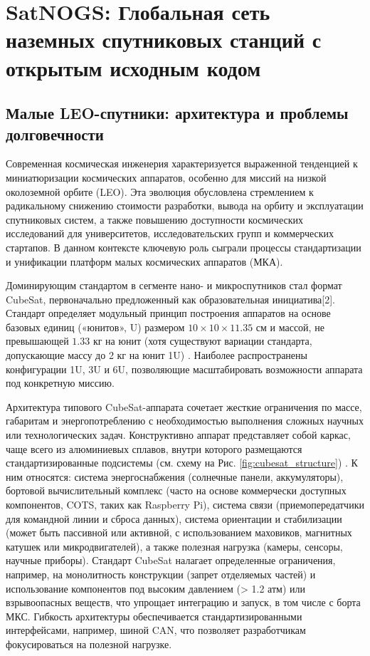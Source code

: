 \chapter{SatNOGS: Глобальная сеть наземных спутниковых станций с открытым исходным кодом}

\section{Малые LEO-спутники: архитектура и проблемы долговечности}

Современная космическая инженерия характеризуется выраженной тенденцией к миниатюризации космических аппаратов, особенно для миссий на низкой околоземной орбите (LEO). Эта эволюция обусловлена стремлением к радикальному снижению стоимости разработки, вывода на орбиту и эксплуатации спутниковых систем, а также повышению доступности космических исследований для университетов, исследовательских групп и коммерческих стартапов. В данном контексте ключевую роль сыграли процессы стандартизации и унификации платформ малых космических аппаратов (МКА).

Доминирующим стандартом в сегменте нано- и микроспутников стал формат CubeSat, первоначально предложенный как образовательная инициатива[2]. Стандарт определяет модульный принцип построения аппаратов на основе базовых единиц («юнитов», U) размером $10 \times 10 \times 11.35$ см и массой, не превышающей $1.33$ кг на юнит (хотя существуют вариации стандарта, допускающие массу до 2 кг на юнит 1U) \cite{cubesat_standard_2014}. Наиболее распространены конфигурации 1U, 3U и 6U, позволяющие масштабировать возможности аппарата под конкретную миссию.

Архитектура типового CubeSat-аппарата сочетает жесткие ограничения по массе, габаритам и энергопотреблению с необходимостью выполнения сложных научных или технологических задач\cite{cubesat_arch_jones_2022, cubesat_low_orbit_nasa_2020}. Конструктивно аппарат представляет собой каркас, чаще всего из алюминиевых сплавов, внутри которого размещаются стандартизированные подсистемы (см. схему на Рис. \ref{fig:cubesat_structure}) \cite{cubesat_standard_2014, cubesat_trends_lee_2023}. К ним относятся: система энергоснабжения (солнечные панели, аккумуляторы), бортовой вычислительный комплекс (часто на основе коммерчески доступных компонентов, COTS, таких как Raspberry Pi\cite{cubesat_trends_lee_2023}), система связи (приемопередатчики для командной линии и сброса данных), система ориентации и стабилизации (может быть пассивной или активной, с использованием маховиков, магнитных катушек или микродвигателей), а также полезная нагрузка (камеры, сенсоры, научные приборы)\cite{cubesat_standard_2014}. Стандарт CubeSat налагает определенные ограничения, например, на монолитность конструкции (запрет отделяемых частей) и использование компонентов под высоким давлением (> 1.2 атм) или взрывоопасных веществ, что упрощает интеграцию и запуск, в том числе с борта МКС\cite{cubesat_standard_2014}. Гибкость архитектуры обеспечивается стандартизированными интерфейсами, например, шиной CAN\cite{cubesat_trends_lee_2023}, что позволяет разработчикам фокусироваться на полезной нагрузке\cite{cubesat_trends_lee_2023}.

